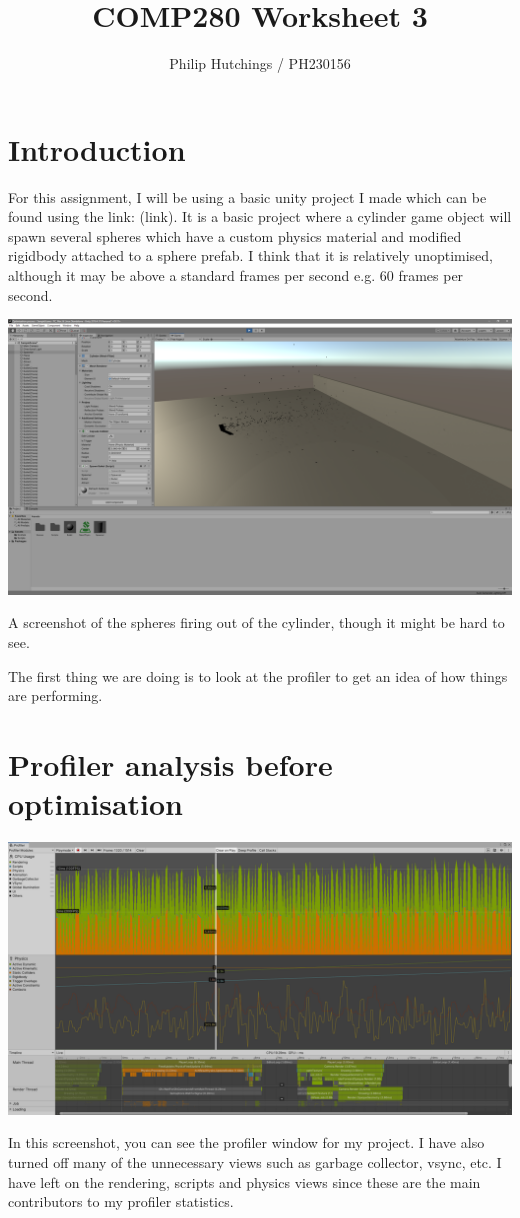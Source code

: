 \documentclass{article}
\title{COMP280 Worksheet 3}
\author{Philip Hutchings / PH230156}
\begin{document}
\maketitle

\section{Introduction}

For this assignment, I will be using a basic unity project I made which can be found using the link: (link).
It is a basic project where a cylinder game object will spawn several spheres which have a custom physics material and modified rigidbody attached to a sphere prefab. I think that it is relatively unoptimised, although it may be above a standard frames per second e.g. 60 frames per second.

\includegraphics[width=15cm]{images/lookatproject.png}\par
A screenshot of the spheres firing out of the cylinder, though it might be hard to see.

The first thing we are doing is to look at the profiler to get an idea of how things are performing.
\section{Profiler analysis before optimisation}

\includegraphics[width=15cm]{images/profiler.png}\par
In this screenshot, you can see the profiler window for my project. I have also turned off many of the unnecessary views such as garbage collector, vsync, etc. I have left on the rendering, scripts and physics views since these are the main contributors to my profiler statistics. 
\end{document}
